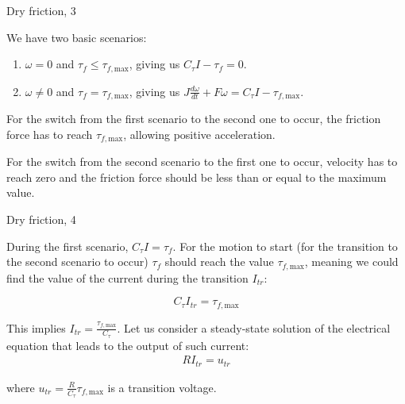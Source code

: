 \documentclass{beamer}
\begin{document}
\begin{frame}{Dry friction, 3}
	\begin{flushleft}
		
		We have two basic scenarios:
		
		\begin{enumerate}
			\item $\omega = 0$ and $\tau_f \leq \tau_{f, \text{max}}$, giving us $C_\tau I - \tau_f = 0$.
			
			\item $\omega \neq 0$ and $\tau_f = \tau_{f, \text{max}}$, giving us $J \frac{d \omega}{dt} + F \omega = C_\tau I - \tau_{f, \text{max}}$.
		\end{enumerate}
		
		For the switch from the first scenario to the second one to occur, the friction force has to reach $\tau_{f, \text{max}}$, allowing positive acceleration.
		
		\bigskip
		
		For the switch from the second scenario to the first one to occur, velocity has to reach zero and the friction force should be less than or equal to the maximum value.
		
	\end{flushleft}
\end{frame}



\begin{frame}{Dry friction, 4}
	\begin{flushleft}
		
		During the first scenario, $C_\tau I = \tau_f$. For the motion to start (for the transition to the second scenario to occur) $\tau_f$ should reach the value $\tau_{f, \text{max}}$, meaning we could find the value of the current during the transition $I_{tr}$:
		
		\begin{equation}
			C_\tau I_{tr} = \tau_{f, \text{max}}
		\end{equation}
		
		This implies $I_{tr} = \frac{\tau_{f, \text{max}}}{C_\tau}$.  Let us consider a steady-state solution of the electrical equation that leads to the output of such current:
		\begin{align}
			R I_{tr} = u_{tr}
		\end{align}
		
		where $u_{tr} = \frac{R}{C_\tau} \tau_{f, \text{max}}$ is a transition voltage.
		
	\end{flushleft}
\end{frame}
\end{document}
